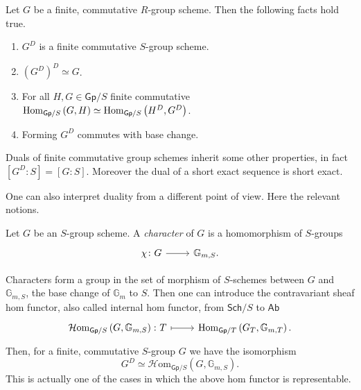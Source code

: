 \begin{thm}\label{thm:CartierDuality}
	Let $G$ be a finite, commutative $R$-group scheme.
	Then the following facts hold true.
\begin{enumerate}
	\item $G^D$ is a finite commutative $S$-group scheme.
	\item $( G^D )^D \simeq G$.
	\item For all $H,G \in \mathsf{Gp}/S$ finite commutative 
	$\operatorname{Hom}_{\mathsf{Gp}/S} \left( G, H \right) \simeq
	\operatorname{Hom}_{\mathsf{Gp}/S} \left( H^D, G^D \right)$.
	\item Forming $G^D$ commutes with base change.
\end{enumerate}
\end{thm}


\begin{rem}[]\label{rem:DualityOtherProperties}
	Duals of finite commutative group schemes inherit some other properties,
	in fact $[G^D : S] = [G : S]$.
	Moreover the dual of a short exact sequence is short exact.
\end{rem}


\noindent
One can also interpret duality from a different point of view.
Here the relevant notions.
\begin{defn}
	Let $G$ be an $S$-group scheme.
	A \emph{character} of $G$ is a homomorphism of $S$-groups
	\begin{equation*}
	\begin{tikzcd}[row sep = 0ex
		,/tikz/column 1/.append style={anchor=base east}
		,/tikz/column 2/.append style={anchor=base west}]
		\chi\colon G \arrow[r, "", rightarrow] &
		\mathbb{G}_{ m,S }
	.\end{tikzcd}
	\end{equation*} 
\end{defn}


\begin{rem}\label{rem:DualasHomFct}
	Characters form a group in the set of morphism of $S$-schemes
	between $G$ and $\mathbb{G}_{m,S}$, the base change of $\mathbb{G}_m$ to $S$.
	Then one can introduce the contravariant sheaf hom functor, also called
	internal hom functor, from $\mathsf{Sch}/S$ to $\mathsf{Ab}$
	\begin{equation*}
	\begin{tikzcd}[row sep = 0ex
		,/tikz/column 1/.append style={anchor=base east}
		,/tikz/column 2/.append style={anchor=base west}]
		\mathcal{H}\mathrm{om}_{\mathsf{Gp}/S} \left( G, \mathbb{G}_{m,S} \right)\colon
		T \arrow[r, "", mapsto] & 
		\Hom_{\mathsf{Gp}/T} \left( G_T, \mathbb{G}_{m,T} \right)
	.\end{tikzcd}
	\end{equation*} 
	Then, for a finite, commutative $S$-group $G$ we have the isomorphism
	\begin{equation*}
		G^D \simeq \mathcal{H}\mathrm{om}_{\mathsf{Gp}/S} \left( G, \mathbb{G}_{m,S} \right)
	.\end{equation*} 
	This is actually one of the cases in which the above hom functor
	is representable.
\end{rem}


